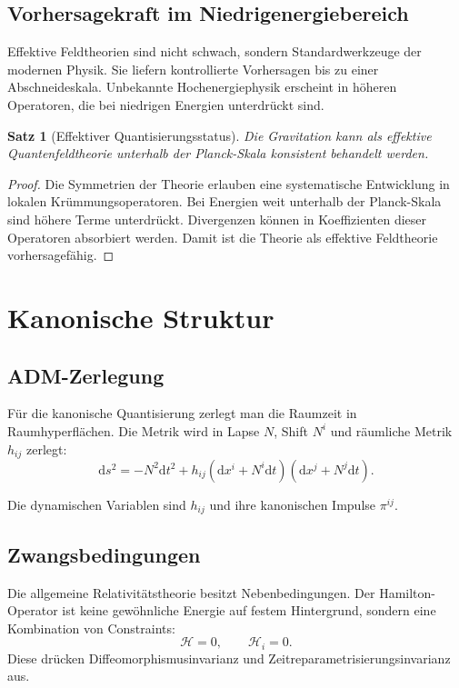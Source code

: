 \documentclass[11pt,a4paper]{book}
\newtheorem{satz}{Satz}[chapter]
\theoremstyle{remark}
\newcommand{\diff}{\mathrm{d}}
\begin{document}
\section{Vorhersagekraft im Niedrigenergiebereich}
Effektive Feldtheorien sind nicht schwach, sondern Standardwerkzeuge der modernen Physik. Sie liefern kontrollierte Vorhersagen bis zu einer Abschneideskala. Unbekannte Hochenergiephysik erscheint in höheren Operatoren, die bei niedrigen Energien unterdrückt sind.

\begin{satz}[Effektiver Quantisierungsstatus]
Die Gravitation kann als effektive Quantenfeldtheorie unterhalb der Planck-Skala konsistent behandelt werden.
\end{satz}

\begin{proof}
Die Symmetrien der Theorie erlauben eine systematische Entwicklung in lokalen Krümmungsoperatoren. Bei Energien weit unterhalb der Planck-Skala sind höhere Terme unterdrückt. Divergenzen können in Koeffizienten dieser Operatoren absorbiert werden. Damit ist die Theorie als effektive Feldtheorie vorhersagefähig.
\end{proof}

\chapter{Kanonische Struktur}
\section{ADM-Zerlegung}
Für die kanonische Quantisierung zerlegt man die Raumzeit in Raumhyperflächen. Die Metrik wird in Lapse $N$, Shift $N^i$ und räumliche Metrik $h_{ij}$ zerlegt:
\begin{equation}
\diff s^2=-N^2\diff t^2+h_{ij}(\diff x^i+N^i\diff t)(\diff x^j+N^j\diff t).
\end{equation}

Die dynamischen Variablen sind $h_{ij}$ und ihre kanonischen Impulse $\pi^{ij}$.

\section{Zwangsbedingungen}
Die allgemeine Relativitätstheorie besitzt Nebenbedingungen. Der Hamilton-Operator ist keine gewöhnliche Energie auf festem Hintergrund, sondern eine Kombination von Constraints:
\begin{equation}
\mathcal{H}=0,
\qquad
\mathcal{H}_i=0.
\end{equation}
Diese drücken Diffeomorphismusinvarianz und Zeitreparametrisierungsinvarianz aus.
\end{document}

